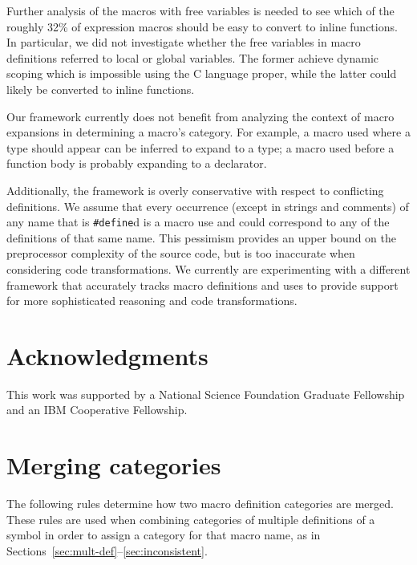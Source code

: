 \documentclass[10pt]{article}
\begin{document}
Further analysis of the macros with free variables is needed to see which
of the roughly 32\% of expression macros should be easy to convert to
inline functions.  In particular, we did not investigate whether the free
variables in macro definitions referred to local or global variables.  The
former achieve dynamic scoping which is impossible using the C language
proper, while the latter could likely be converted to inline functions.

Our framework currently does not benefit from analyzing the context of
macro expansions in determining a macro's category.  For example, a
macro used where a type should appear can be inferred to expand to a
type; a macro used before a function body is probably expanding to a
declarator.

Additionally, the framework is overly conservative with respect to
conflicting definitions.  We assume that every occurrence (except in
strings and comments) of any name that is \texttt{\#define}d is a macro
use and could correspond to any of the definitions of that same name.
This pessimism provides an upper bound on the preprocessor complexity of
the source code, but is too inaccurate when considering code
transformations.  We currently are experimenting with a different
framework that accurately tracks macro definitions and uses to provide
support for more sophisticated reasoning and code transformations.

\section*{Acknowledgments}

This work was supported by a National Science Foundation Graduate
Fellowship and an IBM Cooperative Fellowship.
    


{\small }


\appendix

\section{Merging categories}
\label{app:category-lub}

The following rules determine how two macro definition categories are
merged.  These rules are used when combining categories of multiple
definitions of a symbol in order to assign a category for that macro name,
as in Sections~\ref{sec:mult-def}--\ref{sec:inconsistent}.
\end{document}
